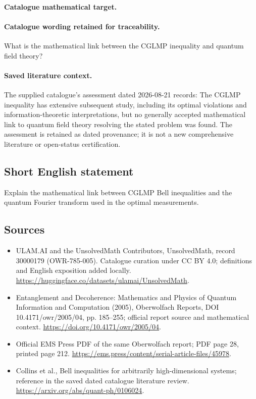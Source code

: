 \documentclass[11pt]{article}
\begin{document}
\paragraph{Catalogue mathematical target.}
\paragraph{Catalogue wording retained for traceability.}
What is the mathematical link between the CGLMP inequality and quantum field theory?

\paragraph{Saved literature context.} The supplied catalogue's assessment dated 2026-08-21 records: The CGLMP inequality has extensive subsequent study, including its optimal violations and information-theoretic interpretations, but no generally accepted mathematical link to quantum field theory resolving the stated problem was found. The assessment is retained as dated provenance; it is not a new comprehensive literature or open-status certification.
\subsection{Short English statement}
Explain the mathematical link between CGLMP Bell inequalities and the quantum Fourier transform used in the optimal measurements.
\subsection{Sources}
\begin{itemize}
\item[\hypertarget{source:30000179:1}{S1}] ULAM.AI and the UnsolvedMath Contributors, UnsolvedMath, record 30000179 (OWR-785-005). Catalogue curation under CC BY 4.0; definitions and English exposition added locally.
\url{https://huggingface.co/datasets/ulamai/UnsolvedMath}.
\item[\hypertarget{source:30000179:2}{S2}] Entanglement and Decoherence: Mathematics and Physics of Quantum Information and Computation (2005), Oberwolfach Reports, DOI 10.4171/owr/2005/04, pp. 185--255; official report source and mathematical context.
\url{https://doi.org/10.4171/owr/2005/04}.
\item[\hypertarget{source:30000179:3}{S3}] Official EMS Press PDF of the same Oberwolfach report; PDF page 28, printed page 212.
\url{https://ems.press/content/serial-article-files/45978}.
\item[\hypertarget{source:30000179:4}{S4}] Collins et al., Bell inequalities for arbitrarily high-dimensional systems; reference in the saved dated catalogue literature review.
\url{https://arxiv.org/abs/quant-ph/0106024}.
\end{itemize}
\label{end:30000179}
\end{document}
